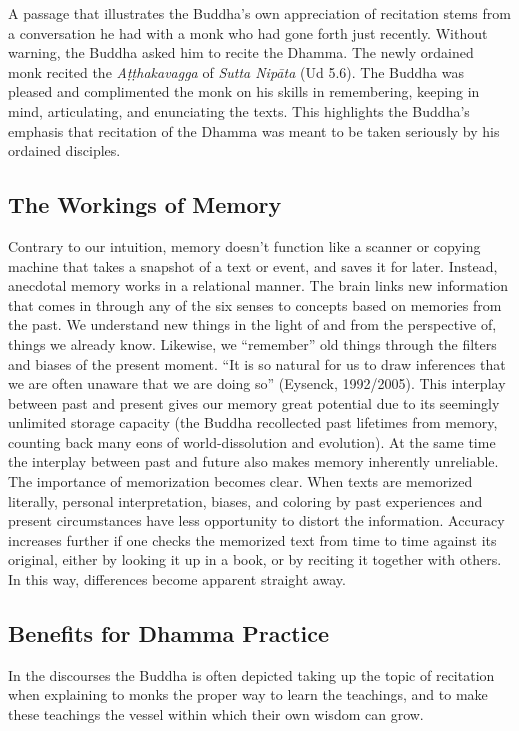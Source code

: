 A passage that illustrates the Buddha's own appreciation of recitation stems from a conversation he had with a monk who had gone forth just recently. Without warning, the Buddha asked him to recite the Dhamma. The newly ordained monk recited the \textit{Aṭṭhakavagga} of \textit{Sutta Nipāta} (Ud 5.6). The Buddha was pleased and complimented the monk on his skills in remembering, keeping in mind, articulating, and enunciating the texts. This highlights the Buddha's emphasis that recitation of the Dhamma was meant to be taken seriously by his ordained disciples.

\subsection*{The Workings of Memory}

Contrary to our intuition, memory doesn't function like a scanner or copying machine that takes a snapshot of a text or event, and saves it for later. Instead, anecdotal memory works in a relational manner. The brain links new information that comes in through any of the six senses to concepts based on memories from the past. We understand new things in the light of and from the perspective of, things we already know. Likewise, we ``remember'' old things through the filters and biases of the present moment. ``It is so natural for us to draw inferences that we are often unaware that we are doing so'' (Eysenck, 1992/2005). This interplay between past and present gives our memory great potential due to its seemingly unlimited storage capacity (the Buddha recollected past lifetimes from memory, counting back many eons of world-dissolution and evolution). At the same time the interplay between past and future also makes memory inherently unreliable. The importance of memorization becomes clear. When texts are memorized literally, personal interpretation, biases, and coloring by past experiences and present circumstances have less opportunity to distort the information. Accuracy increases further if one checks the memorized text from time to time against its original, either by looking it up in a book, or by reciting it together with others. In this way, differences become apparent straight away.

\subsection*{Benefits for Dhamma Practice}

In the discourses the Buddha is often depicted taking up the topic of recitation when explaining to monks the proper way to learn the teachings, and to make these teachings the vessel within which their own wisdom can grow.

